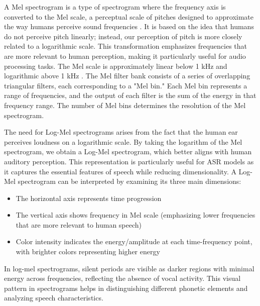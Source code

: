 \documentclass[../report.tex]{subfiles}
\begin{document}
    A Mel spectrogram is a type of spectrogram where the frequency axis is converted to the Mel scale, a perceptual scale of pitches designed to approximate the way humans perceive sound frequencies \cite{mel_scale}. It is based on the idea that humans do not perceive pitch linearly; instead, our perception of pitch is more closely related to a logarithmic scale. This transformation emphasizes frequencies that are more relevant to human perception, making it particularly useful for audio processing tasks. The Mel scale is approximately linear below 1 kHz and logarithmic above 1 kHz \cite{stanford_nlp_lecture}. The Mel filter bank consists of a series of overlapping triangular filters, each corresponding to a "Mel bin." Each Mel bin represents a range of frequencies, and the output of each filter is the sum of the energy in that frequency range. The number of Mel bins determines the resolution of the Mel spectrogram.

    The need for Log-Mel spectrograms arises from the fact that the human ear perceives loudness on a logarithmic scale. By taking the logarithm of the Mel spectrogram, we obtain a Log-Mel spectrogram, which better aligns with human auditory perception. This representation is particularly useful for ASR models as it captures the essential features of speech while reducing dimensionality.
    A Log-Mel spectrogram can be interpreted by examining its three main dimensions:
    \begin{itemize}
        \item The horizontal axis represents time progression
        \item The vertical axis shows frequency in Mel scale (emphasizing lower frequencies that are more relevant to human speech)
        \item Color intensity indicates the energy/amplitude at each time-frequency point, with brighter colors representing higher energy
    \end{itemize}
    
    In log-mel spectrograms, silent periods are visible as darker regions with minimal energy across frequencies, reflecting the absence of vocal activity. This visual pattern in spectrograms helps in distinguishing different phonetic elements and analyzing speech characteristics.
    
\end{document}
